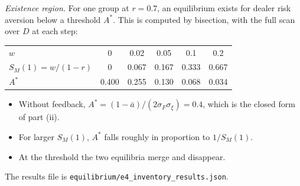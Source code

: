 \documentclass[12pt]{article}
\theoremstyle{definition}
\theoremstyle{remark}
\begin{document}
\emph{Existence region.} For one group at $r=0.7$, an equilibrium exists for dealer risk aversion below a threshold $A^*$. This is computed by bisection, with the full scan over $D$ at each step:
\begin{center}\small
\begin{tabular}{lccccc}
\hline
$w$ & 0 & 0.02 & 0.05 & 0.1 & 0.2\\
$S_M(1)=w/(1-r)$ & 0 & 0.067 & 0.167 & 0.333 & 0.667\\
$A^*$ & 0.400 & 0.255 & 0.130 & 0.068 & 0.034\\
\hline
\end{tabular}
\end{center}
\begin{itemize}[itemsep=1pt,topsep=2pt]
\item Without feedback, $A^*=(1-\bar a)/(2\sigma_F\sigma_\xi)=0.4$, which is the closed form of part (ii).
\item For larger $S_M(1)$, $A^*$ falls roughly in proportion to $1/S_M(1)$.
\item At the threshold the two equilibria merge and disappear.
\end{itemize}
The results file is \nolinkurl{equilibrium/e4_inventory_results.json}.
\end{document}
